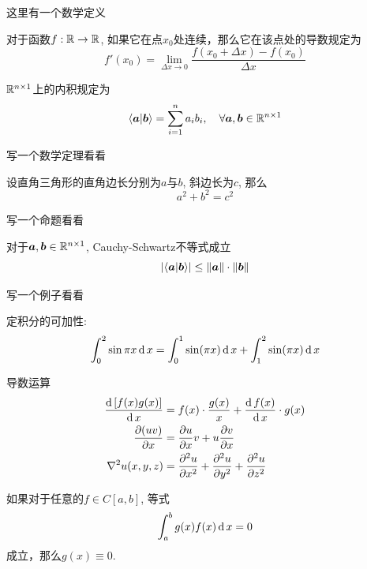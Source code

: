 这里有一个数学定义
\begin{definition}
对于函数$f: \mathbb{R} \to \mathbb{R}$, 如果它在点$x_0$处连续，那么它在该点处的导数规定为
\begin{equation}
f'(x_0) = \lim_{\Delta x\to 0} \frac{f(x_0 + \Delta x) - f(x_0)}{\Delta x}
\end{equation}
\end{definition}

\begin{definition}[内积]
$\mathbb{R}^{{n}\times {1}}$上的内积规定为
\begin{equation}
\langle \bm{a} | \bm{b} \rangle = \sum^n_{i=1} a_ib_i, \quad \forall \bm{a}, \bm{b}\in \mathbb{R}^{{n}\times {1}}
\end{equation}
\end{definition}

写一个数学定理看看
\begin{theorem}
设直角三角形的直角边长分别为$a$与$b$, 斜边长为$c$, 那么
\begin{equation}
a^2 + b^2 = c^2
\end{equation}
\end{theorem}


写一个命题看看
\begin{proposition}
对于$\bm{a},\bm{b}\in \mathbb{R}^{{n}\times {1}}$, Cauchy-Schwartz不等式成立
\begin{equation}
\left| \langle \bm{a} | \bm{b} \rangle \right|\le \left\lVert \bm{a} \right\rVert\cdot \left\lVert \bm{b} \right\rVert
\end{equation}
\end{proposition}



写一个例子看看

\begin{example}
定积分的可加性:
$$
\int^2_0 \sin \pi x \operatorname{\mathrm{d}} x = \int^1_0 \sin(\pi x) \operatorname{\mathrm{d}} x + \int^2_1 \sin(\pi x) \operatorname{\mathrm{d}} x
$$
\end{example}

\begin{example} 导数运算
\begin{align}
\frac{\operatorname{\mathrm{d}} {[f(x)g(x)]}}{\operatorname{\mathrm{d}} {x}} 
&= f(x)\cdot \frac{g(x)}{x} + \frac{\operatorname{\mathrm{d}} {f(x)}}{\operatorname{\mathrm{d}} {x}}\cdot g(x) \\
\frac{\partial {(uv)}}{\partial {x}}& = \frac{\partial {u}}{\partial {x}}v + u\frac{\partial {v}}{\partial {x}}\\
\nabla^2u(x,y,z)& = \frac{\partial^2 {u}}{\partial {x}^2} + \frac{\partial^2 {u}}{\partial {y}^2} +\frac{\partial^2 {u}}{\partial {z}^2}
\end{align}
\end{example}

\begin{lemma} 如果对于任意的$f\in C[a,b]$, 等式
$$
\int^b_a g(x) f(x)\operatorname{\mathrm{d}} x = 0
$$
成立，那么$g(x)\equiv 0$.
\end{lemma}

